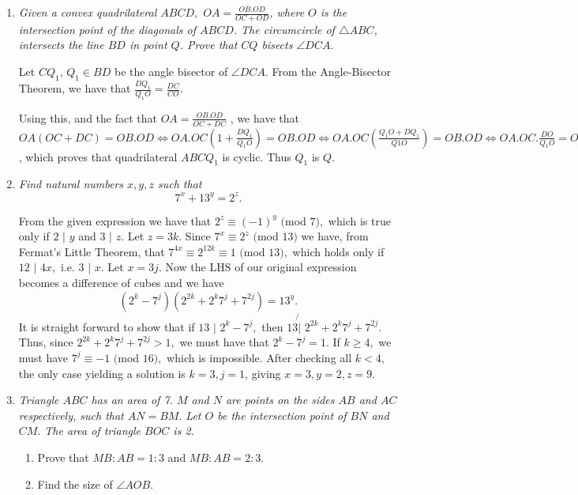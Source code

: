 \documentclass{article}
\begin{document}
\begin{enumerate}[1.]
\vspace{24pt}
\item %
{\itshape Given a convex quadrilateral $ABCD,$ $ OA = \frac{OB.OD}{OC+OD}$, where $O$ is the intersection point of the diagonals of $ABCD$. The circumcircle of $\triangle ABC$, intersects the line $BD$ in point $Q$. Prove that $CQ$ bisects $\angle DCA.$\\}

Let $CQ_1$, $Q_1 \in BD$ be the angle bisector of $\angle DCA$. From the Angle-Bisector Theorem, we have that $\frac{DQ_1}{Q_1O}=\frac{DC}{CO}$.

Using this, and the fact
that $OA = \frac{OB.OD}{OC + DC}$ , we have that $OA(OC + DC) = OB.OD \iff OA.OC (1 + \frac{DQ_1}{Q_1O}) = OB.OD \iff OA.OC (\frac{Q_1O + DQ_1}{Q1O})= OB.OD \iff OA.OC.\frac{DO}{Q_1O} = OB.OD \iff OA.CO = Q_1O.OB$, which proves that
quadrilateral $ABCQ_1$ is cyclic. Thus $Q_1$ is $Q$.


\vspace{24pt}
\item %
{\itshape Find natural numbers $x,y,z$ such that $$7^x +13^y = 2^z.$$}


From the given expression we have that $2^z \equiv (-1)^y$ $($mod $ 7),$ which is true only if $2$ $|$ $y$ and $3$ $|$ $z.$ Let $z = 3k.$ Since $7^x \equiv 2^z$ $($mod $13)$ we have, from Fermat's Little Theorem, that $7^{4x} \equiv 2^{12k} \equiv 1$ $($mod $13),$ which holds only if $12$ $|$ $4x,$ i.e. $3$ $|$ $x.$ Let $x = 3j.$ Now the LHS of our original expression becomes a difference of cubes and we have $$(2^k -7^j)(2^{2k}+2^k7^j+7^{2j}) = 13^y.$$ It is straight forward to show that if $13$ $|$ $2^k - 7^j,$ then $13 \not{|}$ $2^{2k} + 2^k7^j + 7^{2j}.$ Thus, since $2^{2k} + 2^k7^j + 7^{2j} > 1,$ we must have that $2^k - 7^j = 1.$ If $k \geq 4,$ we must have $7^j \equiv -1$ $($mod $16),$ which is impossible. After checking all $k<4,$ the only case yielding a solution is $k = 3, j=1$, giving $x=3,y=2, z=9.$


\vspace{24pt}
\item %
{\itshape Triangle $ABC$ has an area of 7. $M$ and $N$ are points on the sides $AB$ and $AC$ respectively, such that $AN = BM.$ Let $O$ be the intersection point of $BN$ and $CM.$ The area of triangle $BOC$ is 2.
\begin{enumerate}
\item Prove that $MB:AB = 1:3$ and $MB:AB = 2:3.$
\item Find the size of $\angle AOB.$\\
\end{enumerate}}


\end{enumerate}
\end{document}
